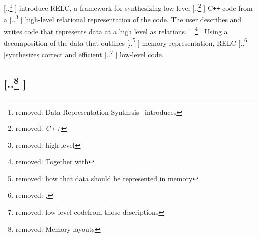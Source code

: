\documentclass[acmsmall,review,anonymous]{acmart}\settopmatter{printfolios=true,printccs=false,printacmref=false}
\newcommand{\relc}{{\sc RELC}\xspace}
\providecommand{\DIFaddtex}[1]{{\protect\color{blue} \sf #1}} %
\providecommand{\DIFdeltex}[1]{{\protect\color{red} [..\footnote{removed: #1} ]}} %
\providecommand{\DIFaddbegin}{} %
\providecommand{\DIFaddend}{} %
\providecommand{\DIFdelbegin}{} %
\providecommand{\DIFdelend}{} %
\providecommand{\DIFadd}[1]{\texorpdfstring{\DIFaddtex{#1}}{#1}} %
\providecommand{\DIFdel}[1]{\texorpdfstring{\DIFdeltex{#1}}{}} %
\newcommand{\DIFscaledelfig}{0.5}
\newlength{\DIFdelgraphicswidth} %
\newlength{\DIFdelgraphicsheight} %
\newcommand{\DIFaddincludegraphics}[2][]{{\color{blue}\fbox{\DIFOincludegraphics[#1]{#2}}}} %
\newcommand{\DIFdelincludegraphics}[2][]{%
\sbox{\DIFdelgraphicsbox}{\DIFOincludegraphics[#1]{#2}}%
\settoboxwidth{\DIFdelgraphicswidth}{\DIFdelgraphicsbox} %
\settoboxtotalheight{\DIFdelgraphicsheight}{\DIFdelgraphicsbox} %
\scalebox{\DIFscaledelfig}{%
\parbox[b]{\DIFdelgraphicswidth}{\usebox{\DIFdelgraphicsbox}\\[-\baselineskip] \rule{\DIFdelgraphicswidth}{0em}}\llap{\resizebox{\DIFdelgraphicswidth}{\DIFdelgraphicsheight}{%
\setlength{\unitlength}{\DIFdelgraphicswidth}%
\begin{picture}(1,1)%
\thicklines\linethickness{2pt} %
{\color[rgb]{1,0,0}\put(0,0){\framebox(1,1){}}}%
{\color[rgb]{1,0,0}\put(0,0){\line( 1,1){1}}}%
{\color[rgb]{1,0,0}\put(0,1){\line(1,-1){1}}}%
\end{picture}%
}\hspace*{3pt}}} %
} %
\DeclareRobustCommand{\DIFaddbegin}{\DIFOaddbegin \let\includegraphics\DIFaddincludegraphics} %
\DeclareRobustCommand{\DIFaddend}{\DIFOaddend \let\includegraphics\DIFOincludegraphics} %
\DeclareRobustCommand{\DIFdelbegin}{\DIFOdelbegin \let\includegraphics\DIFdelincludegraphics} %
\DeclareRobustCommand{\DIFdelend}{\DIFOaddend \let\includegraphics\DIFOincludegraphics} %
\begin{document}
\DIFdelbegin \DIFdel{Data Representation Synthesis~\cite{Hawkins} introduces }\DIFdelend \DIFaddbegin \DIFadd{\citet{Hawkins} introduce }\DIFaddend \relc, a framework for synthesizing low-level \DIFdelbegin \DIFdel{\textit{C++} }\DIFdelend \DIFaddbegin \DIFadd{C\texttt{++} }\DIFaddend code from a \DIFdelbegin \DIFdel{high level
}\DIFdelend \DIFaddbegin \DIFadd{high-level
}\DIFaddend relational representation of the code. The user describes and writes code that represents data at a high level as relations. \DIFdelbegin \DIFdel{Together with }\DIFdelend \DIFaddbegin \DIFadd{Using }\DIFaddend a decomposition
of the data that outlines \DIFdelbegin \DIFdel{how that data should be represented in memory }\DIFdelend \DIFaddbegin \DIFadd{memory representation}\DIFaddend , \relc \DIFdelbegin \DIFdel{, }\DIFdelend synthesizes correct and efficient \DIFdelbegin \DIFdel{low level codefrom those descriptions}\DIFdelend \DIFaddbegin \DIFadd{low-level code}\DIFaddend .

\DIFdelbegin \subsection{\DIFdel{Memory layouts}}
\addtocounter{subsection}{-1}%

\end{document}
